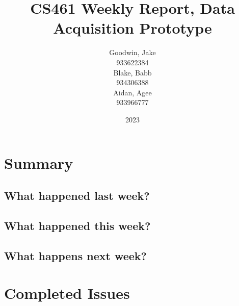 \documentclass{article}
\title{CS461 Weekly Report, Data Acquisition Prototype}
\author{
    Goodwin, Jake\\
    933622384\\
    Blake, Babb\\
    934306388\\
    Aidan, Agee\\
    933966777\\
}
\date{2023}
\begin{document}
\section{Summary}


\subsection{What happened last week?}

\subsection{What happened this week?}

\subsection{What happens next week?}


\section{Completed Issues}
\end{document}
